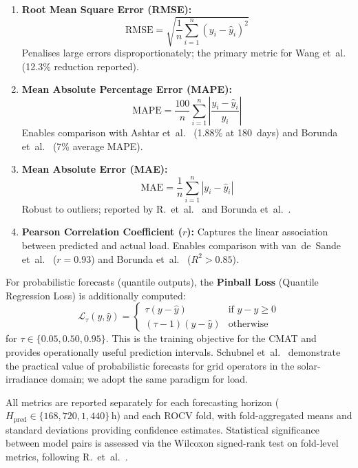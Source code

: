 \begin{enumerate}
    \item \textbf{Root Mean Square Error (RMSE):}
    \begin{equation}
        \text{RMSE} = \sqrt{\frac{1}{n} \sum_{i=1}^{n} (y_i - \hat{y}_i)^2}
    \end{equation}
    Penalises large errors disproportionately; the primary metric for Wang et~al.~\cite{wang_causal-aware_2025} (12.3\% reduction reported).

    \item \textbf{Mean Absolute Percentage Error (MAPE):}
    \begin{equation}
        \text{MAPE} = \frac{100}{n} \sum_{i=1}^{n} \left| \frac{y_i - \hat{y}_i}{y_i} \right|
    \end{equation}
    Enables comparison with Ashtar et~al.~\cite{ashtar_hybrid_2025} (1.88\% at 180~days) and Borunda et~al.~\cite{borunda_machine_2025} (7\% average MAPE).

    \item \textbf{Mean Absolute Error (MAE):}
    \begin{equation}
        \text{MAE} = \frac{1}{n} \sum_{i=1}^{n} |y_i - \hat{y}_i|
    \end{equation}
    Robust to outliers; reported by R.~et~al.~\cite{r_forecasting_2025} and Borunda et~al.~\cite{borunda_machine_2025}.

    \item \textbf{Pearson Correlation Coefficient ($r$):}
    Captures the linear association between predicted and actual load. Enables comparison with van~de~Sande et~al.~\cite{van_de_sande_enhancing_2024} ($r = 0.93$) and Borunda et~al.~\cite{borunda_machine_2025} ($R^2 > 0.85$).
\end{enumerate}

For probabilistic forecasts (quantile outputs), the \textbf{Pinball Loss} (Quantile Regression Loss) is additionally computed:
\begin{equation}
    \mathcal{L}_{\tau}(y, \hat{y}) = \begin{cases}
        \tau (y - \hat{y}) & \text{if } y - \hat{y} \ge 0 \\
        (\tau - 1)(y - \hat{y}) & \text{otherwise}
    \end{cases}
\end{equation}
for $\tau \in \{0.05, 0.50, 0.95\}$. This is the training objective for the CMAT and provides operationally useful prediction intervals. Schubnel et~al.~\cite{schubnel_solarcrossformer_2025} demonstrate the practical value of probabilistic forecasts for grid operators in the solar-irradiance domain; we adopt the same paradigm for load.

All metrics are reported separately for each forecasting horizon ($H_{\text{pred}} \in \{168, 720, 1{,}440\}$\,h) and each ROCV fold, with fold-aggregated means and standard deviations providing confidence estimates. Statistical significance between model pairs is assessed via the Wilcoxon signed-rank test on fold-level metrics, following R.~et~al.~\cite{r_forecasting_2025}.
